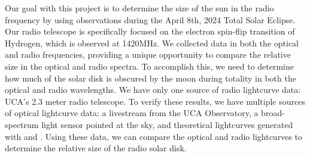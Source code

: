 Our goal with this project is to determine the size of the sun in the radio frequency by using observations during the April 8th, 2024 Total Solar Eclipse.
Our radio telescope is specifically focused on the electron spin-flip transition of Hydrogen, which is observed at 1420MHz.
We collected data in both the optical and radio frequencies, providing a unique opportunity to compare the relative size in the optical and radio spectra.
To accomplish this, we need to determine how much of the solar disk is obscured by the moon during totality in both the optical and radio wavelengths.
We have only one source of radio lightcurve data: UCA's 2.3 meter radio telescope.
To verify these results, we have multiple sources of optical lightcurve data: a livestream from the UCA Observatory, a broad-spectrum light sensor pointed at the sky, and theoretical lightcurves generated with \cite{zotti_simulated_2020} and \cite{nasa_jpl_solar_system_dynamics_group_jpl_nodate}.
Using these data, we can compare the optical and radio lightcurves to determine the relative size of the radio solar disk.